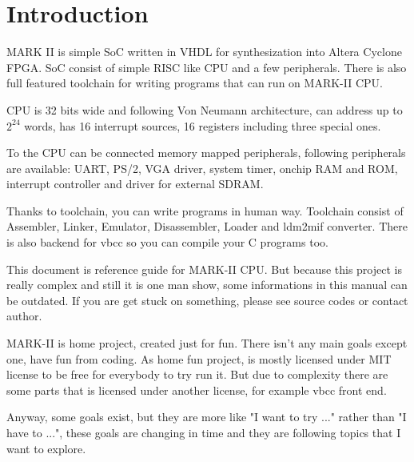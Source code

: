 \section{Introduction}

MARK II is simple SoC written in VHDL for synthesization into Altera Cyclone
FPGA. SoC consist of simple RISC like CPU and a few peripherals. There is also
full featured toolchain for writing programs that can run on MARK-II CPU.

CPU is 32 bits wide and following Von Neumann architecture, can address up to
$2^{24}$ words, has 16 interrupt sources, 16 registers including three special
ones.

To the CPU can be connected memory mapped peripherals, following 
peripherals are available: UART, PS/2, VGA driver, system timer, onchip 
RAM and ROM, interrupt controller and driver for external SDRAM.

Thanks to toolchain, you can write programs in human way. Toolchain consist of
Assembler, Linker, Emulator, Disassembler, Loader and ldm2mif converter. There is
also backend for vbcc so you can compile your C programs too.

This document is reference guide for MARK-II CPU. But because this project is really
complex and still it is one man show, some informations in this manual can be
outdated. If you are get stuck on something, please see source codes or
contact author.

MARK-II is home project, created just for fun. There isn't any main goals
except one, have fun from coding. As home fun project, is mostly licensed under
MIT license to be free for everybody to try run it. But due to complexity there
are some parts that is licensed under another license, for example vbcc front
end.

Anyway, some goals exist, but they are more like "I want to try ..." rather than
"I have to ...", these goals are changing in time and they are following topics
that I want to explore.
